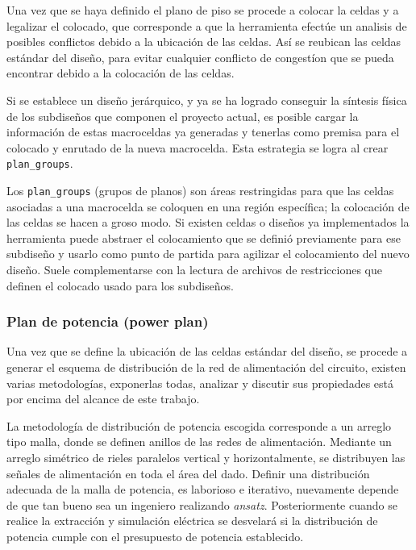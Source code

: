 Una vez que se haya definido el plano de piso se procede a colocar la celdas y a legalizar el colocado, que corresponde a que la herramienta efectúe un analisis de posibles conflictos debido a la ubicación de las celdas. Así se reubican las celdas estándar del diseño, para evitar cualquier conflicto de congestíon que se pueda encontrar debido a la colocación de las celdas.

Si se establece un diseño jerárquico, y ya se ha logrado conseguir la síntesis física de los subdiseños que componen el proyecto actual, es posible cargar la información de estas macroceldas ya generadas y tenerlas como premisa para el colocado y enrutado de la nueva macrocelda. Esta estrategia se logra al crear \texttt{plan\_groups}.

Los \texttt{plan\_groups} (grupos de planos) son áreas restringidas para que las celdas asociadas a una macrocelda se coloquen en una región específica; la colocación de las celdas se hacen a groso modo. Si existen celdas o diseños ya implementados la herramienta puede abstraer el colocamiento que se definió previamente para ese subdiseño y usarlo como punto de partida para agilizar el colocamiento del nuevo diseño. Suele complementarse con la lectura de archivos de restricciones que definen el colocado usado para los subdiseños.

\subsubsection{Plan de potencia (power plan)}

Una vez que se define la ubicación de las celdas estándar del diseño, se procede a generar el esquema de distribución de la red de alimentación del circuito, existen varias metodologías, exponerlas todas, analizar y discutir sus propiedades está por encima del alcance de este trabajo.

La metodología de distribución de potencia escogida corresponde a un arreglo tipo malla, donde se definen anillos de las redes de alimentación. Mediante un arreglo simétrico de rieles paralelos vertical y horizontalmente, se distribuyen las señales de alimentación en toda el área del dado. Definir una distribución adecuada de la malla de potencia, es laborioso e iterativo, nuevamente depende de que tan bueno sea un ingeniero realizando \textit{ansatz}. Posteriormente cuando se realice la extracción y simulación eléctrica se desvelará si la distribución de potencia cumple con el presupuesto de potencia establecido.

